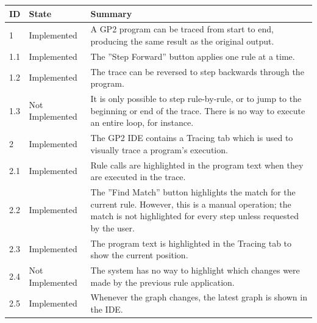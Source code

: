 \documentclass[authoryearcitations]{UoYCSproject}
\begin{document}
\begin{table}[!htb]
    \begin{tabularx}{\linewidth}{|l|l|X|}
        \hline
        \textbf{ID} & \textbf{State} & \textbf{Summary} \\ \hline
        1    &  Implemented     & A GP2 program can be traced from start to end, producing
                                  the same result as the original output. \\ \hline
        1.1  &  Implemented     & The ''Step Forward'' button applies one rule at a time. \\ \hline
        1.2  &  Implemented     & The trace can be reversed to step backwards through the
                                  program. \\ \hline
        1.3  &  Not Implemented & It is only possible to step rule-by-rule, or to jump to
                                  the beginning or end of the trace. There is no way to
                                  execute an entire loop, for instance. \\ \hline

        2    &  Implemented     & The GP2 IDE contains a Tracing tab which is used to
                                  visually trace a program's execution. \\ \hline
        2.1  &  Implemented     & Rule calls are highlighted in the program text when they
                                  are executed in the trace. \\ \hline
        2.2  &  Implemented     & The ''Find Match'' button highlights the match for the
                                  current rule. However, this is a manual operation; the
                                  match is not highlighted for every step unless requested
                                  by the user. \\ \hline
        2.3  &  Implemented     & The program text is highlighted in the Tracing tab to
                                  show the current position. \\ \hline
        2.4  &  Not Implemented & The system has no way to highlight which changes were made
                                  by the previous rule application. \\ \hline
        2.5  &  Implemented     & Whenever the graph changes, the latest graph is shown in
                                  the IDE. \\ \hline


\end{tabularx}
\end{table}
\end{document}
